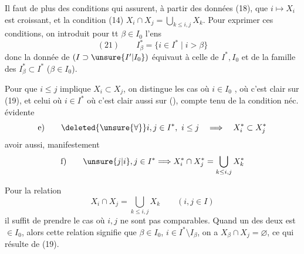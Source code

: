 Il faut de plus des conditions qui assurent,
à partir des données (18), que $i\mapsto X_i$
est croissant, et  la condition (14)
$X_i\cap X_j=\bigcup_{k\le i,j}X_k$. Pour  exprimer ces conditions,
on introduit pour tt $\beta\in I_0$ l'ens
\[
(21)\qquad I_\beta^*=\{i\in I^*\mid i>\beta\}
\]
donc la donnée de $(I\supset\unsure{I'|I_0})$
 équivaut à celle
de $I^*,I_0$  et de la famille des
$I_\beta^*\subset I^*$ ($\beta\in I_0$).

Pour  que 
$i\le j$  implique $X_i\subset X_j$,
on distingue les cas où $i\in I_0$\inserted{$=\beta$}
, où c'est
clair sur (19), et celui où $i\in I^*$ où  c'est
clair aussi sur (), compte tenu de la condition
néc. évidente
\[
\text{e)}\qquad \deleted{\unsure{\forall}} i,j\in I^*,\ i\le j
\quad\Longrightarrow\quad X_i^*\subset X_j^*
\]
 avoir aussi, manifestement
\[
\text{f)}\qquad \unsure{j|i},j\in I^*\Longrightarrow
X_i^*\cap X_j^*=\bigcup_{k\le i,j}X_k^*
\]

Pour la relation
\[
X_i\cap X_j=\bigcup_{k\le i,j}X_k\qquad(i,j\in I)
\]
il  suffit de prendre le cas où $i,j$ ne
sont pas comparables. Quand un des deux
est $\in I_0$, alors cette relation  signifie que
$\beta\in I_0$, $i\in I^*\setminus I_\beta$, on a
$X_\beta\cap X_j=\varnothing$, ce qui résulte de (19).
